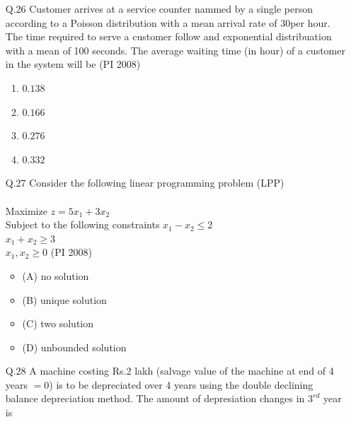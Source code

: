\documentclass[journal,12pt,onecolumn]{IEEEtran}
\theoremstyle{remark}
\begin{document}
\begin{enumerate}
    \hfill{(PI 2008)}
    \begin{multicols}{4}
    \begin{enumerate}[label=(\Alph*)]
        \item $Rs.10,00,000$
        \item $Rs.15,00,000$
        \item $Rs.20,00,000$
        \item $Rs.25,00,000$
    \end{enumerate}
\end{multicols}
\item[\textnormal{Q.26}]  Customer arrives at a service counter nammed by a single person according to a Poisson distribution with a mean arrival rate of 30per hour. The time required to serve a customer follow and exponential distribuation with a mean of 100 seconds. The average waiting time (in hour) of a customer in the system will be
    \hfill{(PI 2008)}
    \begin{multicols}{4}
    \begin{enumerate}[label=(\Alph*)]
        \item $0.138$
        \item $0.166$
        \item $0.276$
        \item $0.332$
    \end{enumerate}
\end{multicols}
\item[\textnormal{Q.27}] Consider the following linear programming problem (LPP)  \\ \\
Maximize $z=5x_1+3x_2$\\
Subject to the following constraints
$x_1-x_2\leq2$\\
$x_1+x_2\geq 3$\\
$x_1,x_2\geq 0$
    \hfill{(PI 2008)}
    \begin{itemize}[label={}]
        \item (A) no solution
        \item (B) unique solution
        \item (C) two solution
        \item (D) unbounded solution
    \end{itemize}
\vspace{1cm}
 \item[\textnormal{Q.28}]  A machine costing Rs.2 lakh (salvage value of the machine at end of 4 years $= 0$) is to be depreciated over 4 years using the double declining balance depreciation method. The amount of depresiation changes in $3^{rd}$ year is 

\end{enumerate}
\end{document}
